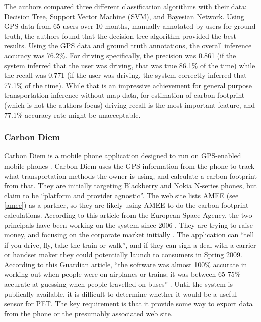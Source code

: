 The authors compared three different classification algorithms with their data: 
Decision Tree, Support Vector Machine (SVM), and Bayesian Network. Using GPS data from 65 users over 10 months, manually annotated by users for ground truth, the authors found that the decision tree algorithm provided the best results. Using the GPS data and ground truth annotations, the overall inference accuracy was 76.2\%. For driving specifically, the precision was 0.861 (if the system inferred that the user was driving, that was true 86.1\% of the time) while the recall was 0.771 (if the user was driving, the system correctly inferred that 77.1\% of the time). While that is an impressive achievement for general purpose transportation inference without map data, for estimation of carbon footprint (which is not the authors focus) driving recall is the most important feature, and 77.1\% accuracy rate might be unacceptable.

\subsubsection{Carbon Diem}

Carbon Diem is a mobile phone application designed to run on GPS-enabled mobile phones \cite{Carbon-Diem-website}. Carbon Diem uses the GPS information from the phone to track what transportation methods the owner is using, and calculate a carbon footprint from that. They are initially targeting Blackberry and Nokia N-series phones, but claim to be ``platform and provider agnostic''. The web site lists AMEE (see \autoref{amee}) as a partner, so they are likely using AMEE to do the carbon footprint calculations. According to this article from the European Space Agency, the two principals have been working on the system since 2006 \cite{ESA-carbon-hero-2008}. They are trying to raise money, and focusing on the corporate market initially \cite{Fehrenbacher2008Carbon-Hero}. The application can ``tell if you drive, fly, take the train or walk'', and if they can sign a deal with a carrier or handset maker they could potentially launch to consumers in Spring 2009. According to this Guardian article, ``the software was almost 100\% accurate in working out when people were on airplanes or trains; it was between 65-75\% accurate at guessing when people travelled on buses'' \cite{Jha2008Carbon-Diem}. Until the system is publically available, it is difficult to determine whether it would be a useful sensor for PET. The key requirement is that it provide some way to export data from the phone or the presumably associated web site.

